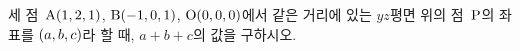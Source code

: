 세 점~$\mathrm{A}(1{,}\mkern3mu\mathopen{}2{,}\mkern3mu\mathopen{}1)$, $\mathrm{B}(-1{,}\mkern3mu\mathopen{}0{,}\mkern3mu\mathopen{}1)$, $\mathrm{O}(0{,}\mkern3mu\mathopen{}0{,}\mkern3mu\mathopen{}0)$에서 같은 거리에 있는 $yz$평면 위의 점~$\mathrm{P}$의 좌표를 $(a{,}\mkern3mu\mathopen{}b{,}\mkern3mu\mathopen{}c)$라 할 때, $a+b+c$의 값을 구하시오.
